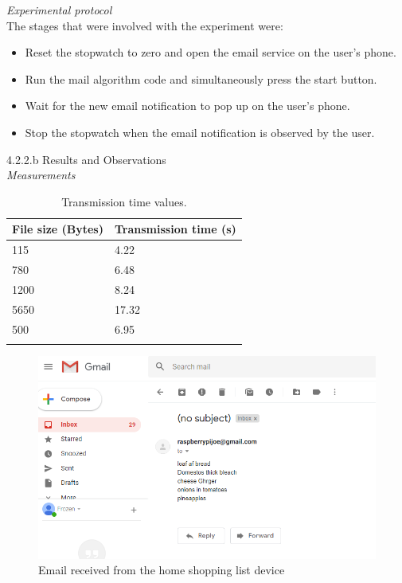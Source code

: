 \textit{Experimental protocol}\\
The stages that were involved with the experiment were:
\begin{itemize}
	\item Reset the stopwatch to zero and open the email service on the user's phone.
	\item Run the mail algorithm code and simultaneously press the start button.
	\item Wait for the new email notification to pop up on the user's phone.
	\item  Stop the stopwatch when the email notification is observed by the user.
\end{itemize}

4.2.2.b Results and Observations\\
\textit{Measurements}\\
\begin{center}
	\begin{longtable}{|p{5cm}|p{5cm}|}
		\hline
		\textbf{File size (Bytes)} &
		\textbf{Transmission time (s)} \\
		\hline
		115
		&
		4.22
		\\
		\hline
		780
		&
		6.48
		\\
		\hline
		1200
		&
		8.24
		\\
		\hline
		5650
		&
		17.32
		\\
		\hline
		500
		&
		6.95
		\\
		\hline		
		\caption{Transmission time values.}
	\end{longtable}
\end{center}

\begin{figure}[h]
	\centering
	\includegraphics[scale=0.7]{110}
	\caption{Email received from the home shopping list device}
\end{figure}

